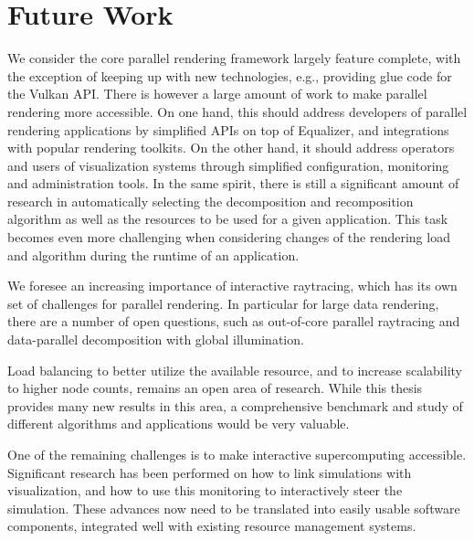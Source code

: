 \section{Future Work}

We consider the core parallel rendering framework largely feature complete,
with the exception of keeping up with new technologies, e.g., providing glue
code for the Vulkan API. There is however a large amount of work to make
parallel rendering more accessible. On one hand, this should address developers
of parallel rendering applications by simplified APIs on top of Equalizer, and
integrations with popular rendering toolkits. On the other hand, it should
address operators and users of visualization systems through simplified
configuration, monitoring and administration tools. In the same spirit, there
is still a significant amount of research in automatically selecting the
decomposition and recomposition algorithm as well as the resources to be used
for a given application. This task becomes even more challenging when
considering changes of the rendering load and algorithm during the runtime of
an application.

We foresee an increasing importance of interactive raytracing, which has its
own set of challenges for parallel rendering. In particular for large data
rendering, there are a number of open questions, such as out-of-core parallel
raytracing and data-parallel decomposition with global illumination.

Load balancing to better utilize the available resource, and to increase
scalability to higher node counts, remains an open area of research. While this
thesis provides many new results in this area, a comprehensive benchmark and
study of different algorithms and applications would be very valuable.

One of the remaining challenges is to make interactive supercomputing
accessible. Significant research has been performed on how to link simulations
with visualization, and how to use this monitoring to interactively steer the
simulation. These advances now need to be translated into easily usable
software components, integrated well with existing resource management systems.